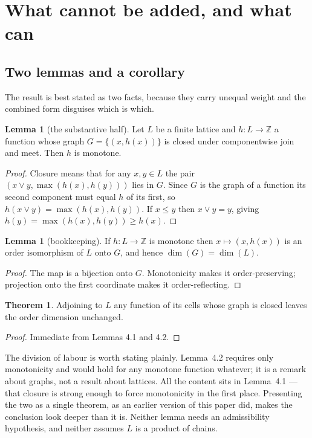\documentclass[11pt,a4paper]{article}
\theoremstyle{definition}
\newtheorem{lemma}[proposition]{Lemma}
\newtheorem{theorem}[proposition]{Theorem}
\begin{document}
\section{What cannot be added, and what can}
\label{sec:lemmas}

\subsection{Two lemmas and a corollary}
The result is best stated as two facts, because they carry unequal weight and
the combined form disguises which is which.

\begin{lemma}[the substantive half]
Let $L$ be a finite lattice and $h:L\to\mathbb{Z}$ a function whose graph
$G=\{(x,h(x))\}$ is closed under componentwise join and meet. Then $h$ is
monotone.
\end{lemma}
\begin{proof}
Closure means that for any $x,y\in L$ the pair $(x\vee y,\max(h(x),h(y)))$ lies
in $G$. Since $G$ is the graph of a function its second component must equal $h$
of its first, so $h(x\vee y)=\max(h(x),h(y))$. If $x\le y$ then $x\vee y=y$,
giving $h(y)=\max(h(x),h(y))\ge h(x)$.
\end{proof}

\begin{lemma}[bookkeeping]
If $h:L\to\mathbb{Z}$ is monotone then $x\mapsto(x,h(x))$ is an order
isomorphism of $L$ onto $G$, and hence $\dim(G)=\dim(L)$.
\end{lemma}
\begin{proof}
The map is a bijection onto $G$. Monotonicity makes it order-preserving;
projection onto the first coordinate makes it order-reflecting.
\end{proof}

\begin{theorem}
Adjoining to $L$ any function of its cells whose graph is closed leaves the
order dimension unchanged.
\end{theorem}
\begin{proof}
Immediate from Lemmas 4.1 and 4.2.
\end{proof}

The division of labour is worth stating plainly. Lemma~4.2 requires only
monotonicity and would hold for any monotone function whatever; it is a remark
about graphs, not a result about lattices. All the content sits in Lemma~4.1 ---
that closure is strong enough to force monotonicity in the first place.
Presenting the two as a single theorem, as an earlier version of this paper did,
makes the conclusion look deeper than it is. Neither lemma needs an
admissibility hypothesis, and neither assumes $L$ is a product of chains.
\end{document}
